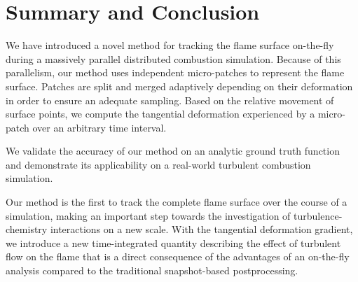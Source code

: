 
%
\section{Summary and Conclusion} %
\label{sec:fst_summary_and_conclusion}
%
We have introduced a novel method for tracking the flame surface on-the-fly
during a massively parallel distributed combustion simulation.
%
Because of this parallelism, our method uses independent micro-patches to
represent the flame surface.
%
Patches are split and merged adaptively depending on their deformation in order
to ensure an adequate sampling.
%
Based on the relative movement of surface points, we compute the tangential
deformation experienced by a micro-patch over an arbitrary time interval.
%

%
We validate the accuracy of our method on an analytic ground truth function
and demonstrate its applicability on a real-world turbulent combustion
simulation.
%

%
Our method is the first to track the complete flame surface over the course of a
simulation, making an important step towards the investigation of
turbulence-chemistry interactions on a new scale.
%
With the tangential deformation gradient, we introduce a new time-integrated
quantity describing the effect of turbulent flow on the flame that is a direct
consequence of the advantages of an on-the-fly analysis compared to the
traditional snapshot-based postprocessing.
%
